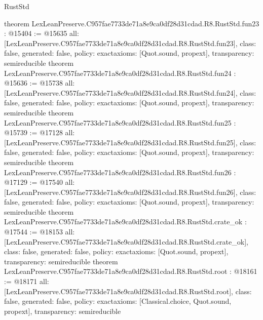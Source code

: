 \begin{lexlean}{RustStd}
\begin{coremodule}
{}
theorem LexLeanPreserve.C957fae7733de71a8e9ca0df28d31cdad.R8.RustStd.fun23 : @15404 := @15635 {
  all: [LexLeanPreserve.C957fae7733de71a8e9ca0df28d31cdad.R8.RustStd.fun23],
  class: false,
  generated: false,
  policy: exact{axioms: [Quot.sound, propext]},
  transparency: semireducible
}
theorem LexLeanPreserve.C957fae7733de71a8e9ca0df28d31cdad.R8.RustStd.fun24 : @15636 := @15738 {
  all: [LexLeanPreserve.C957fae7733de71a8e9ca0df28d31cdad.R8.RustStd.fun24],
  class: false,
  generated: false,
  policy: exact{axioms: [Quot.sound, propext]},
  transparency: semireducible
}
theorem LexLeanPreserve.C957fae7733de71a8e9ca0df28d31cdad.R8.RustStd.fun25 : @15739 := @17128 {
  all: [LexLeanPreserve.C957fae7733de71a8e9ca0df28d31cdad.R8.RustStd.fun25],
  class: false,
  generated: false,
  policy: exact{axioms: [Quot.sound, propext]},
  transparency: semireducible
}
theorem LexLeanPreserve.C957fae7733de71a8e9ca0df28d31cdad.R8.RustStd.fun26 : @17129 := @17540 {
  all: [LexLeanPreserve.C957fae7733de71a8e9ca0df28d31cdad.R8.RustStd.fun26],
  class: false,
  generated: false,
  policy: exact{axioms: [Quot.sound, propext]},
  transparency: semireducible
}
theorem LexLeanPreserve.C957fae7733de71a8e9ca0df28d31cdad.R8.RustStd.crate_ok : @17544 := @18153 {
  all: [LexLeanPreserve.C957fae7733de71a8e9ca0df28d31cdad.R8.RustStd.crate_ok],
  class: false,
  generated: false,
  policy: exact{axioms: [Quot.sound, propext]},
  transparency: semireducible
}
theorem LexLeanPreserve.C957fae7733de71a8e9ca0df28d31cdad.R8.RustStd.root : @18161 := @18171 {
  all: [LexLeanPreserve.C957fae7733de71a8e9ca0df28d31cdad.R8.RustStd.root],
  class: false,
  generated: false,
  policy: exact{axioms: [Classical.choice, Quot.sound, propext]},
  transparency: semireducible
}


\end{coremodule}
\end{lexlean}
